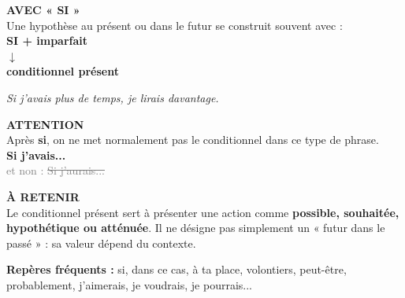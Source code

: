 \documentclass[a4paper,11pt]{article}
\begin{document}
\begin{minipage}{0.91\textwidth}
\vspace{2mm}

\begin{minipage}{0.485\textwidth}
\begin{violetbox}[height=3.15cm]
\textbf{\color{VioletDark}AVEC « SI »}\\[1mm]
Une hypothèse au présent ou dans le futur se construit souvent avec :\\[1mm]
\centering
\textbf{SI + imparfait}\\
$\downarrow$\\
\textbf{conditionnel présent}\\[1mm]
\raggedright
\textit{Si j'avais plus de temps, je lirais davantage.}
\end{violetbox}
\end{minipage}
\hfill
\begin{minipage}{0.485\textwidth}
\begin{warnbox}[height=3.15cm]
\textbf{\color{Red}ATTENTION}\\[1mm]
Après \textbf{si}, on ne met normalement pas le conditionnel dans ce type de phrase.\\[1mm]
\textbf{Si j'avais...}\\
\textcolor{Grey}{et non : \sout{Si j'aurais...}}
\end{warnbox}
\end{minipage}

\vspace{2mm}

\begin{violetbox}
\textbf{\color{VioletDark}À RETENIR}\\[1mm]
Le conditionnel présent sert à présenter une action comme \textbf{possible, souhaitée,
hypothétique ou atténuée}. Il ne désigne pas simplement un « futur dans le passé » :
sa valeur dépend du contexte.
\end{violetbox}

\vspace{1.5mm}

\centering
{\small\color{Grey}\textbf{Repères fréquents :} si, dans ce cas, à ta place, volontiers, peut-être, probablement, j'aimerais, je voudrais, je pourrais...}

\end{minipage}
\end{document}
